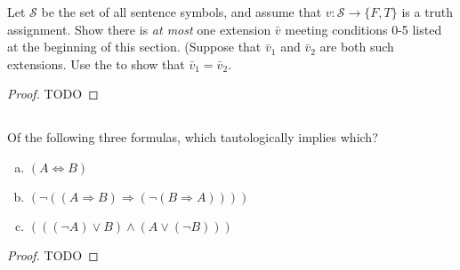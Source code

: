 \documentclass{report}
\begin{document}
  Let $\mathcal{S}$ be the set of all sentence symbols, and assume that
    $v \colon \mathcal{S} \rightarrow \{F, T\}$ is a truth assignment.
  Show there is \textit{at most} one extension $\bar{v}$ meeting conditions 0-5
    listed at the beginning of this section.
  (Suppose that $\bar{v}_1$ and $\bar{v}_2$ are both such extensions. Use the
     to show that $\bar{v}_1 = \bar{v}_2$.

  \begin{proof}
    TODO
  \end{proof}

\subsection{}%

  Of the following three formulas, which tautologically implies which?
    \begin{enumerate}[(a)]
      \item $(A \Leftrightarrow B)$
      \item $(\neg((A \Rightarrow B) \Rightarrow (\neg(B \Rightarrow A))))$
      \item $(((\neg A) \lor B) \land (A \lor (\neg B)))$
    \end{enumerate}

  \begin{proof}
    TODO
  \end{proof}
\end{document}
